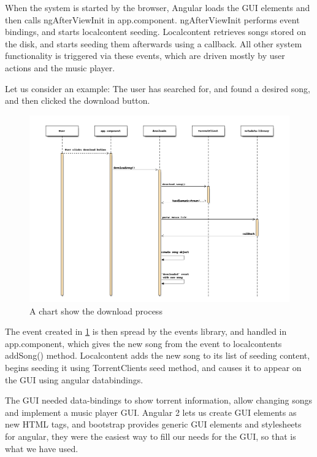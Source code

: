 When the system is started by the browser,
Angular loads the \acs{GUI} elements and then calls ngAfterViewInit in app.component.
ngAfterViewInit performs event bindings, and starts localcontent seeding.
Localcontent retrieves songs stored on the disk, and starts seeding them afterwards using a callback.
All other system functionality is triggered via these events, 
which are driven mostly by user actions and the music player.
\newline

Let us consider an example: The user has searched for, 
and found a desired song, and then clicked the download button.

\begin{figure}[H]
	\centerline{
	\includegraphics[width=1.5\linewidth]{gfx/downloadsong.png}
	}
	\caption{A chart show the download process}
	\label{fig:downloadsong}
\end{figure}

The event created in \ref{fig:downloadsong} is then spread by the events library,
and handled in app.component, 
which gives the new song from the event to localcontents addSong() method.
Localcontent adds the new song to its list of seeding content, 
begins seeding it using TorrentClients seed method,
and causes it to appear on the \acs{GUI} using angular databindings.
\newline

The \acs{GUI} needed data-bindings to show torrent information, allow changing songs
and implement a music player \acs{GUI}. 
Angular 2 lets us create \acs{GUI} elements as new \acs{HTML} tags, 
and bootstrap provides generic \acs{GUI} elements and stylesheets for angular, 
they were the easiest way to fill our needs for the \acs{GUI},
so that is what we have used.

